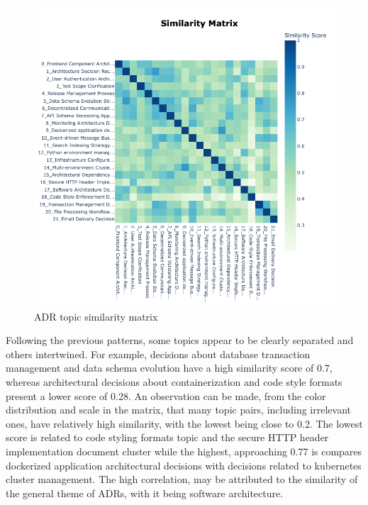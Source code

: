         \begin{figure}[h]
            \centering
            \hspace*{-2cm} 
            \includegraphics[scale=0.55]{figures/BerTopic_Original/heatmap_original.png}
            \caption{ADR topic similarity matrix}
            \label{fig:similarity_matrix_orginal}
        \end{figure}
        
        Following the previous patterns, some topics appear to be clearly separated and others intertwined. For example, decisions about database transaction management and data schema evolution have a high similarity score of 0.7, whereas architectural decisions about containerization and code style formats present a lower score of 0.28. An observation can be made, from the color distribution and scale in the matrix, that many topic pairs, including irrelevant ones, have relatively high similarity, with the lowest being close to 0.2. The lowest score is related to code styling formats topic and the secure HTTP header implementation document cluster while the highest, approaching 0.77 is compares dockerized application architectural decisions with decisions related to kubernetes cluster management. The high correlation, may be attributed to the similarity of the general theme of ADRs, with it being software architecture.

